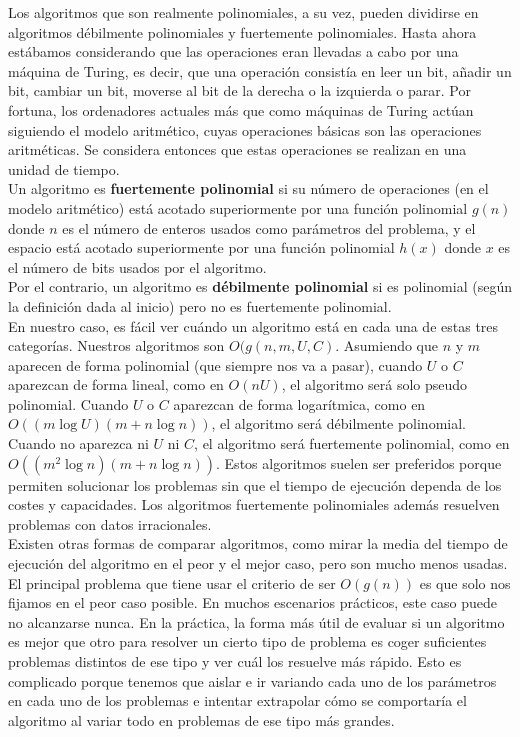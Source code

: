 Los algoritmos que son realmente polinomiales, a su vez, pueden dividirse en algoritmos débilmente polinomiales y fuertemente polinomiales.
Hasta ahora estábamos considerando que las operaciones eran llevadas a cabo por una máquina de Turing, es decir, que una operación consistía en leer un bit, añadir un bit, cambiar un bit, moverse al bit de la derecha o la izquierda o parar.
Por fortuna, los ordenadores actuales más que como máquinas de Turing actúan siguiendo el modelo aritmético, cuyas operaciones básicas son las operaciones aritméticas.
Se considera entonces que estas operaciones se realizan en una unidad de tiempo.\\

Un algoritmo es \textbf{fuertemente polinomial} si su número de operaciones (en el modelo aritmético) está acotado superiormente por una función polinomial $g(n)$ donde $n$ es el número de enteros usados como parámetros del problema, y el espacio está acotado superiormente por una función polinomial $h(x)$ donde $x$ es el número de bits usados por el algoritmo.\\

Por el contrario, un algoritmo es \textbf{débilmente polinomial} si es polinomial (según la definición dada al inicio) pero no es fuertemente polinomial.\\

En nuestro caso, es fácil ver cuándo un algoritmo está en cada una de estas tres categorías.
Nuestros algoritmos son $O(g(n,m,U,C)$.
Asumiendo que $n$ y $m$ aparecen de forma polinomial (que siempre nos va a pasar), cuando $U$ o $C$ aparezcan de forma lineal, como en $O(nU)$, el algoritmo será solo pseudo polinomial.
Cuando $U$ o $C$ aparezcan de forma logarítmica, como en $O((m\log U)(m+n\log n))$, el algoritmo será débilmente polinomial.
Cuando no aparezca ni $U$ ni $C$, el algoritmo será fuertemente polinomial, como en $O((m^2 \log n) (m+n \log n))$.
Estos algoritmos suelen ser preferidos porque permiten solucionar los problemas sin que el tiempo de ejecución dependa de los costes y capacidades.
Los algoritmos fuertemente polinomiales además resuelven problemas con datos irracionales.\\

Existen otras formas de comparar algoritmos, como mirar la media del tiempo de ejecución del algoritmo en el peor y el mejor caso, pero son mucho menos usadas.
El principal problema que tiene usar el criterio de ser $O(g(n))$ es que solo nos fijamos en el peor caso posible.
En muchos escenarios prácticos, este caso puede no alcanzarse nunca.
En la práctica, la forma más útil de evaluar si un algoritmo es mejor que otro para resolver un cierto tipo de problema es coger suficientes problemas distintos de ese tipo y ver cuál los resuelve más rápido.
Esto es complicado porque tenemos que aislar e ir variando cada uno de los parámetros en cada uno de los problemas e intentar extrapolar cómo se comportaría el algoritmo al variar todo en problemas de ese tipo más grandes.\\

